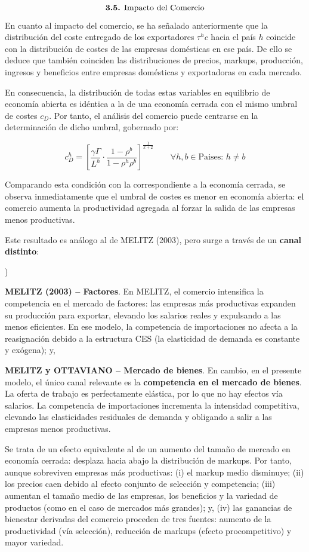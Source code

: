 \documentclass[10pt,a4paper]{article}
\newcounter{alphaitem}
\newenvironment{la}
      {\begin{list}{\alph{alphaitem})}{%
          \usecounter{alphaitem}%
          \setlength{\leftmargin}{1cm}%
          \setlength{\parskip}{3pt}%
          \setlength{\itemsep}{0pt}%
          \setlength{\parsep}{0pt}%
      }}
      {\end{list}}
\begin{document}
$$\text{\textbf{3.5.} Impacto del Comercio}$$
En cuanto al impacto del comercio, se ha señalado anteriormente que la distribución del coste entregado de los exportadores $\tau^h c$ hacia el país $h$ coincide con la distribución de costes de las empresas domésticas en ese país. De ello se deduce que también coinciden las distribuciones de precios, markups, producción, ingresos y beneficios entre empresas domésticas y exportadoras en cada mercado. 

En consecuencia, la distribución de todas estas variables en equilibrio de economía abierta es idéntica a la de una economía cerrada con el mismo umbral de costes $c_D$. Por tanto, el análisis del comercio puede centrarse en la determinación de dicho umbral, gobernado por:

$$c_D^h = \left[ \frac{\gamma\Gamma}{L^h} \cdot \frac{1 - \rho^b}{1 - \rho^h \rho^b} \right]^{\frac{1}{k+2}}\qquad \forall h,b\in\text{Paises}:\,h\neq b$$

Comparando esta condición con la correspondiente a la economía cerrada, se observa inmediatamente que el umbral de costes es menor en economía abierta: el comercio aumenta la productividad agregada al forzar la salida de las empresas menos productivas. 

Este resultado es análogo al de MELITZ (2003), pero surge a través de un \textbf{canal distinto}:
\begin{la}
    \item \textbf{MELITZ (2003) -- Factores}. En MELITZ, el comercio intensifica la competencia en el mercado de factores: las empresas más productivas expanden su producción para exportar, elevando los salarios reales y expulsando a las menos eficientes. En ese modelo, la competencia de importaciones no afecta a la reasignación debido a la estructura CES (la elasticidad de demanda es constante y exógena); y,
    \item \textbf{MELITZ y OTTAVIANO -- Mercado de bienes}. En cambio, en el presente modelo, el único canal relevante es la \textbf{competencia en el mercado de bienes}. La oferta de trabajo es perfectamente elástica, por lo que no hay efectos vía salarios. La competencia de importaciones incrementa la intensidad competitiva, elevando las elasticidades residuales de demanda y obligando a salir a las empresas menos productivas. 
\end{la}

Se trata de un efecto equivalente al de un aumento del tamaño de mercado en economía cerrada: desplaza hacia abajo la distribución de markups. Por tanto, aunque sobreviven empresas más productivas: (i) el markup medio disminuye; (ii) los precios caen debido al efecto conjunto de selección y competencia; (iii) aumentan el tamaño medio de las empresas, los beneficios y la variedad de productos (como en el caso de mercados más grandes); y, (iv) las ganancias de bienestar derivadas del comercio proceden de tres fuentes: aumento de la productividad (vía selección), reducción de markups (efecto procompetitivo) y mayor variedad.
\end{document}
